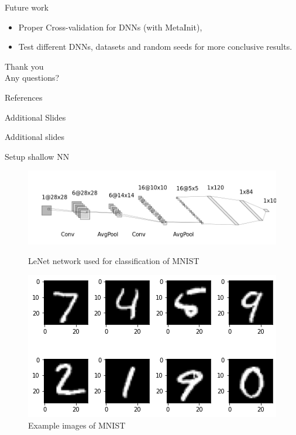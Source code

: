 \documentclass[10pt]{beamer}
\begin{document}
\begin{frame}{Future work}
    \begin{itemize}
        \item Proper Cross-validation for DNNs (with MetaInit),
        \item Test different DNNs, datasets and random seeds for more conclusive results.
    \end{itemize}
    
\end{frame}


\begin{frame}{ }
    \begin{center}
        \Huge Thank you\\ Any questions?
    \end{center}
\end{frame}


\begin{frame}[allowframebreaks]{References}
		\renewcommand*{\bibfont}{\tiny}
		
\end{frame}



\begin{frame}{Additional Slides}
    \begin{center}
        \Huge Additional slides
    \end{center}
\end{frame}

\begin{frame}{Setup shallow NN}
    \begin{figure}
        \centering
    \includegraphics[scale=0.4]{report/midterm presentation/images/LeNet.png}
        \label{fig:lenet}
        \caption{LeNet network used for classification of MNIST}
    \end{figure} 
    \begin{figure}
        \centering
        \includegraphics[width=.5\textwidth]{report/figures/MNIST_example.png}
        \caption{Example images of MNIST}
        \label{fig:MNIST_example}
    \end{figure}
\end{frame}
\end{document}
